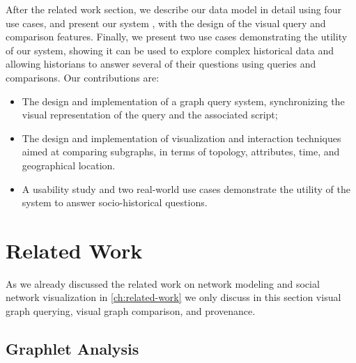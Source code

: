 
After the related work section, we describe our data model in detail using four use cases, and present our system \name, with the design of the visual query and comparison features. Finally, we present two use cases demonstrating the utility of our system, showing it can be used to explore complex historical data and allowing  historians to answer several of their questions using queries and comparisons.
Our contributions are:
\begin{itemize}
    \item The design and implementation of a graph query system, synchronizing the visual representation of the query and the associated script;
    \item The design and implementation of visualization and interaction techniques aimed at comparing subgraphs, in terms of topology, attributes, time, and geographical location.
    \item A  usability study and two real-world use cases demonstrate the utility of the system to answer socio-historical questions.
\end{itemize}



\section{Related Work}

As we already discussed the related work on network modeling and social network visualization in \autoref{ch:related-work} we only discuss in this section visual graph querying, visual graph comparison, and provenance.


\subsection{Graphlet Analysis}

